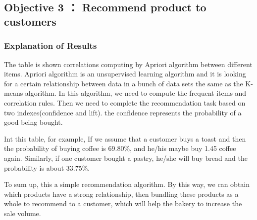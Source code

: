 \documentclass[11pt]{article}
\begin{document}
    \begin{center}
    \end{center}
    { \hspace*{\fill} \\}
    
    \begin{center}
    \end{center}
    { \hspace*{\fill} \\}
    
    \hypertarget{objective-3-recommend-product-to-customers}{%
\subsection{Objective 3 ： Recommend product to
customers}\label{objective-3-recommend-product-to-customers}}

\hypertarget{explanation-of-results}{%
\subsubsection{Explanation of Results}\label{explanation-of-results}}

The table is shown correlations computing by Apriori algorithm between
different items. Apriori algorithm is an unsupervised learning algorithm
and it is looking for a certain relationship between data in a bunch of
data sets the same as the K-means algorithm. In this algorithm, we need
to compute the frequent items and correlation rules. Then we need to
complete the recommendation task based on two indexes(confidence and
lift). the confidence represents the probability of a good being bought.

Int this table, for example, If we assume that a customer buys a toast
and then the probability of buying coffee is 69.80\%, and he/his maybe
buy 1.45 coffee again. Similarly, if one customer bought a pastry,
he/she will buy bread and the probability is about 33.75\%.

To sum up, this a simple recommendation algorithm. By this way, we can
obtain which products have a strong relationship, then bundling these
products as a whole to recommend to a customer, which will help the
bakery to increase the sale volume.
\end{document}

